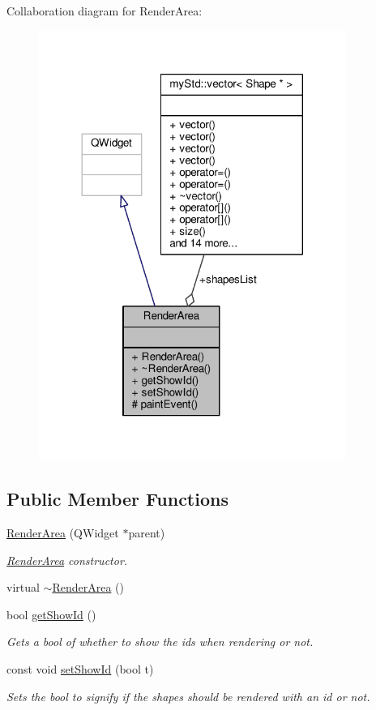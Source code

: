 Collaboration diagram for Render\+Area\+:
\nopagebreak
\begin{figure}[H]
\begin{center}
\leavevmode
\includegraphics[width=284pt]{classRenderArea__coll__graph}
\end{center}
\end{figure}
\subsection*{Public Member Functions}
\begin{DoxyCompactItemize}
\item 
\hyperlink{classRenderArea_a71baad4c7f205d8f3c7fa2b1c7483448}{Render\+Area} (Q\+Widget $\ast$parent)
\begin{DoxyCompactList}\small\item\em \hyperlink{classRenderArea}{Render\+Area} constructor. \end{DoxyCompactList}\item 
virtual \hyperlink{classRenderArea_ade92334d3441242827d5a96fc9cd5f42}{$\sim$\+Render\+Area} ()
\item 
bool \hyperlink{classRenderArea_aff78d4f340f879fb5effa9830e4d77b9}{get\+Show\+Id} ()
\begin{DoxyCompactList}\small\item\em Gets a bool of whether to show the ids when rendering or not. \end{DoxyCompactList}\item 
const void \hyperlink{classRenderArea_a460a86b0f462ad0fd99ae30688754583}{set\+Show\+Id} (bool t)
\begin{DoxyCompactList}\small\item\em Sets the bool to signify if the shapes should be rendered with an id or not. \end{DoxyCompactList}\end{DoxyCompactItemize}
